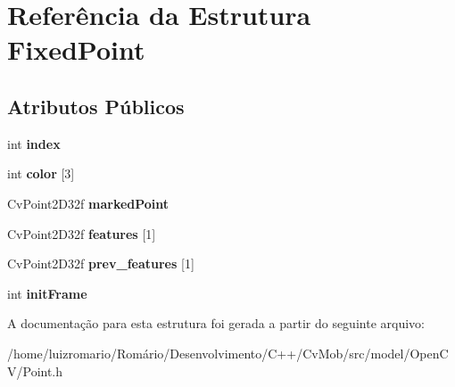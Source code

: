 \hypertarget{structFixedPoint}{
\section{Referência da Estrutura FixedPoint}
\label{structFixedPoint}
}
\subsection*{Atributos Públicos}
\begin{DoxyCompactItemize}
\item 
\hypertarget{structFixedPoint_abbd6af5f960ed2f5073eeeb8d83448bd}{
int {\bfseries index}}
\label{structFixedPoint_abbd6af5f960ed2f5073eeeb8d83448bd}

\item 
\hypertarget{structFixedPoint_a6927c9ffc2d24c8e6dbe50d1eca2ce08}{
int {\bfseries color} \mbox{[}3\mbox{]}}
\label{structFixedPoint_a6927c9ffc2d24c8e6dbe50d1eca2ce08}

\item 
\hypertarget{structFixedPoint_aa6e07a88022b05e9b858b8cbad568572}{
CvPoint2D32f {\bfseries markedPoint}}
\label{structFixedPoint_aa6e07a88022b05e9b858b8cbad568572}

\item 
\hypertarget{structFixedPoint_a2bb8cbec79a11a4207103a27482398c4}{
CvPoint2D32f {\bfseries features} \mbox{[}1\mbox{]}}
\label{structFixedPoint_a2bb8cbec79a11a4207103a27482398c4}

\item 
\hypertarget{structFixedPoint_a831181b3b13bf5e7bc5559264e4c32cf}{
CvPoint2D32f {\bfseries prev\_\-features} \mbox{[}1\mbox{]}}
\label{structFixedPoint_a831181b3b13bf5e7bc5559264e4c32cf}

\item 
\hypertarget{structFixedPoint_aea1b62caa947e534319237e98bd56ee8}{
int {\bfseries initFrame}}
\label{structFixedPoint_aea1b62caa947e534319237e98bd56ee8}

\end{DoxyCompactItemize}


A documentação para esta estrutura foi gerada a partir do seguinte arquivo:\begin{DoxyCompactItemize}
\item 
/home/luizromario/Romário/Desenvolvimento/C++/CvMob/src/model/OpenCV/Point.h\end{DoxyCompactItemize}
